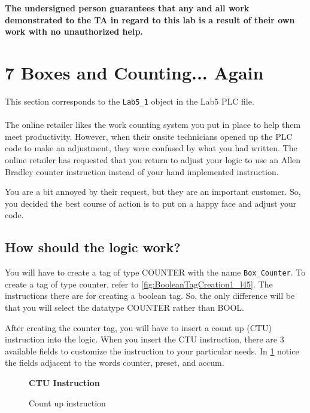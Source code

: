 \textbf{The undersigned person guarantees that any and all work demonstrated to the TA in regard to this lab is a result of their own work with no unauthorized help.}



\section{7 Boxes and Counting... Again}

This section corresponds to the \verb|Lab5_1| object in the Lab5 PLC file.
\\ 
\\

The online retailer likes the work counting system you put in place to help them meet productivity. However, when their onsite technicians opened up the PLC code to make an adjustment, they were confused by what you had written. The online retailer has requested that you return to adjust your logic to use an Allen Bradley counter instruction instead of your hand implemented instruction. 

You are a bit annoyed by their request, but they are an important customer. So, you decided the best course of action is to put on a happy face and adjust your code.

\subsection{How should the logic work?}

You will have to create a tag of type COUNTER with the name \verb|Box_Counter|. To create a tag of type counter, refer to \figureautorefname \ref{fig:BooleanTagCreation1_l45}. The instructions there are for creating a boolean tag. So, the only difference will be that you will select the datatype COUNTER rather than BOOL.

After creating the counter tag, you will have to insert a count up (CTU) instruction into the logic. When you insert the CTU instruction, there are 3 available fields to customize the instruction to your particular needs. In \figureautorefname \ref{fig:CTU} notice the fields adjacent to the words counter, preset, and accum. 

\begin{figure}[h]
\centering
\textbf{CTU Instruction}\par \medskip
{}
\caption{Count up instruction}
\label{fig:CTU}
\end{figure}

